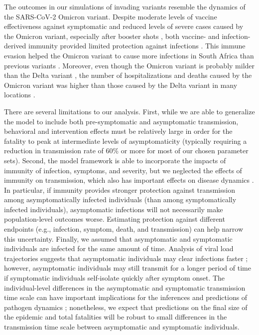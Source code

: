 \documentclass[12pt]{article}
\begin{document}
The outcomes in our simulations of invading variants resemble the dynamics of the SARS-CoV-2 Omicron variant.
Despite moderate levels of vaccine effectiveness against symptomatic and reduced levels of severe cases caused by the Omicron variant, especially after booster shots \citep{andres2022omicron}, both vaccine- and infection-derived immunity provided limited protection against infections \citep{pearson2021omicron}.
This immune evasion helped the Omicron variant to cause more infections in South Africa than previous variants \citep{sun2022omicron}.
Moreover, even though the Omicron variant is probably milder than the Delta variant \citep{MENNI20221618,ulloa2022estimates}, the number of hospitalizations and deaths caused by the Omicron variant was higher than those caused by the Delta variant in many locations \citep{Iacobuccio254,faust2022omicron,sigal2022estimating}.

There are several limitations to our analysis.
First, while we are able to generalize the model to include both pre-symptomatic and asymptomatic transmission, behavioral and intervention effects must be relatively large in order for the fatality to peak at intermediate levels of asymptomaticity (typically requiring a reduction in transmission rate of 60\% or more for most of our chosen parameter sets).
Second, the model framework is able to incorporate the impacts of immunity of infection, symptoms, and severity,
but we neglected the effects of immunity on transmission, which also has important effects on disease dynamics \citep{saad2020immune}.
In particular, if immunity provides stronger protection against transmission among asymptomatically infected individuals (than among symptomatically infected individuals), asymptomatic infections will not necessarily make population-level outcomes worse. 
Estimating protection against different endpoints (e.g., infection, symptom, death, and transmission) can help narrow this uncertainty.
Finally, we assumed that asymptomatic and symptomatic individuals are infected for the same amount of time.
Analysis of viral load trajectories suggests that asymptomatic individuals may clear infections faster \citep{Kissler2020};
however, asymptomatic individuals may still transmit for a longer period of time if symptomatic individuals self-isolate quickly after symptom onset.
The individual-level differences in the asymptomatic and symptomatic transmission time scale can have important implications for the inferences and predictions of pathogen dynamics \citep{park2020time,harris2022time};
nonetheless, we expect that predictions on the final size of the epidemic and total fatalities will be robust to small differences in the transmission time scale between asymptomatic and symptomatic individuals.
\end{document}
